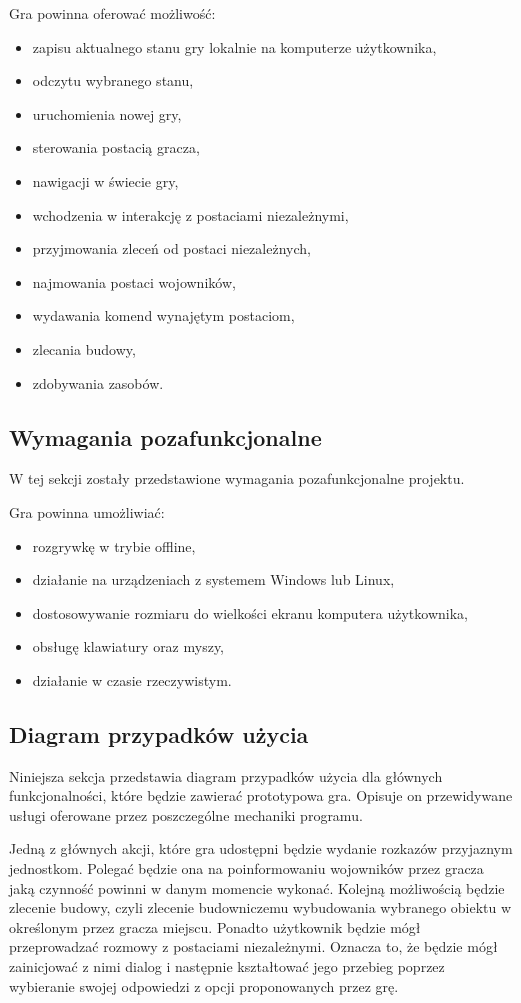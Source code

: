 Gra powinna oferować możliwość:
\begin{itemize}\label{list:fun}
  \item zapisu aktualnego stanu gry lokalnie na komputerze użytkownika,
  \item odczytu wybranego stanu,
  \item uruchomienia nowej gry,
  \item sterowania postacią gracza,
  \item nawigacji w świecie gry,
  \item wchodzenia w interakcję z postaciami niezależnymi,
  \item przyjmowania zleceń od postaci niezależnych,
  \item najmowania postaci wojowników,
  \item wydawania komend wynajętym postaciom,
  \item zlecania budowy,
  \item zdobywania zasobów.
\end{itemize}

\subsection{Wymagania pozafunkcjonalne}\label{ss:nonfun}
W tej sekcji zostały przedstawione wymagania pozafunkcjonalne projektu.

Gra powinna umożliwiać:
\begin{itemize}\label{list:nonfun}
  \item rozgrywkę w trybie offline,
  \item działanie na urządzeniach z systemem Windows lub Linux,
  \item dostosowywanie rozmiaru do wielkości ekranu komputera użytkownika,
  \item obsługę klawiatury oraz myszy,
  \item działanie w czasie rzeczywistym.
\end{itemize}

\subsection{Diagram przypadków użycia}\label{ss:usecase}
Niniejsza sekcja przedstawia diagram przypadków użycia dla głównych funkcjonalności, które będzie zawierać prototypowa gra.
Opisuje on przewidywane usługi oferowane przez poszczególne mechaniki programu.

Jedną z głównych akcji, które gra udostępni będzie wydanie rozkazów przyjaznym jednostkom. Polegać będzie ona na poinformowaniu
wojowników przez gracza jaką czynność powinni w danym momencie wykonać. Kolejną możliwością będzie zlecenie budowy, czyli
zlecenie budowniczemu wybudowania wybranego obiektu w określonym przez gracza miejscu. Ponadto użytkownik
będzie mógł przeprowadzać rozmowy z postaciami niezależnymi. Oznacza to, że będzie mógł zainicjować z nimi dialog i
następnie kształtować jego przebieg poprzez wybieranie swojej odpowiedzi z opcji proponowanych przez grę.

